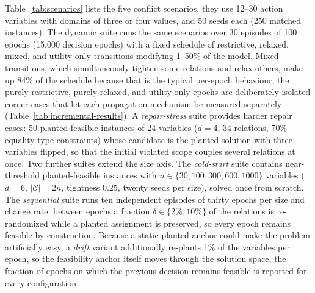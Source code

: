 \documentclass[pdflatex,sn-mathphys-num,iicol,oneside]{sn-jnl}
\begin{document}
Table~\ref{tab:scenarios} lists the five conflict scenarios, they use
12--30 action variables with domains of three or four values, and 50
seeds each (250 matched instances). The dynamic suite runs the same
scenarios over 30 episodes of 100 epochs (15{,}000 decision epochs)
with a fixed schedule of restrictive, relaxed, mixed, and utility-only
transitions modifying 1--50\% of the model. Mixed transitions, which
simultaneously tighten some relations and relax others, make up 84\% of
the schedule because that is the typical per-epoch behaviour, the
purely restrictive, purely relaxed, and utility-only epochs are
deliberately isolated corner cases that let each propagation mechanism
be measured separately (Table~\ref{tab:incremental-results}). A \emph{repair-stress}
suite provides harder repair cases: 50 planted-feasible instances of
24 variables ($d=4$, 34 relations, 70\% equality-type constraints)
whose candidate is the planted solution with three variables flipped,
so that the initial violated scope couples several relations at once.
Two further suites extend the size axis. The \emph{cold-start} suite
contains near-threshold planted-feasible instances with
$n\in\{30,100,300,600,1000\}$ variables ($d=6$, $|\mathcal{C}|=2n$,
tightness $0.25$, twenty seeds per size), solved once from scratch.
The \emph{sequential} suite runs ten independent episodes of thirty
epochs per size and change rate: between epochs a fraction
$\delta\in\{2\%,10\%\}$ of the relations is re-randomized while a
planted assignment is preserved, so every epoch remains feasible by
construction. Because a static planted anchor could make the problem
artificially easy, a \emph{drift} variant additionally re-plants 1\%
of the variables per epoch, so the feasibility anchor itself moves
through the solution space, the fraction of epochs on which the
previous decision remains feasible is reported for every
configuration.
\end{document}

